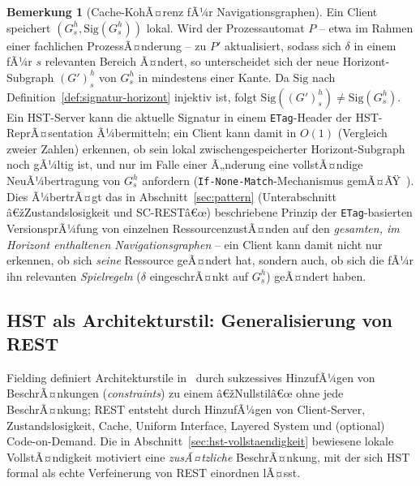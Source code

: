 ﻿\documentclass[a4paper,12pt]{article}
\theoremstyle{definition}
\newtheorem{bemerkung}{Bemerkung}
\begin{document}
\begin{bemerkung}[Cache-KohÃ¤renz fÃ¼r Navigationsgraphen]
	\label{bem:cache-kohaerenz}
	Ein Client speichert $(G_s^h,\mathrm{Sig}(G_s^h))$ lokal. Wird der Prozessautomat
	$P$ -- etwa im Rahmen einer fachlichen ProzessÃ¤nderung -- zu $P'$ aktualisiert,
	sodass sich $\delta$ in einem fÃ¼r $s$ relevanten Bereich Ã¤ndert, so unterscheidet
	sich der neue Horizont-Subgraph $(G')_s^h$ von $G_s^h$ in mindestens einer Kante.
	Da $\mathrm{Sig}$ nach Definition~\ref{def:signatur-horizont} injektiv ist, folgt
	$\mathrm{Sig}((G')_s^h)\ne\mathrm{Sig}(G_s^h)$. Ein HST-Server kann die aktuelle
	Signatur in einem \texttt{ETag}-Header der HST-ReprÃ¤sentation Ã¼bermitteln; ein
	Client kann damit in $O(1)$ (Vergleich zweier Zahlen) erkennen, ob sein lokal
	zwischengespeicherter Horizont-Subgraph noch gÃ¼ltig ist, und nur im Falle einer
	Ã„nderung eine vollstÃ¤ndige NeuÃ¼bertragung von $G_s^h$ anfordern
	(\texttt{If-None-Match}-Mechanismus gemÃ¤ÃŸ~\cite{rfc7231}). Dies Ã¼bertrÃ¤gt das in
	Abschnitt~\ref{sec:pattern} (Unterabschnitt â€žZustandslosigkeit und SC-RESTâ€œ)
	beschriebene Prinzip der \texttt{ETag}-basierten VersionsprÃ¼fung von einzelnen
	RessourcenzustÃ¤nden auf den \emph{gesamten, im Horizont enthaltenen
	Navigationsgraphen} -- ein Client kann damit nicht nur erkennen, ob sich
	\emph{seine} Ressource geÃ¤ndert hat, sondern auch, ob sich die fÃ¼r ihn relevanten
	\emph{Spielregeln} ($\delta$ eingeschrÃ¤nkt auf $G_s^h$) geÃ¤ndert haben.
\end{bemerkung}

\subsection{HST als Architekturstil: Generalisierung von REST}
\label{sec:hst-architekturstil}

Fielding definiert Architekturstile in~\cite{fielding2000} durch sukzessives HinzufÃ¼gen
von BeschrÃ¤nkungen (\emph{constraints}) zu einem â€žNullstilâ€œ ohne jede BeschrÃ¤nkung; REST
entsteht durch HinzufÃ¼gen von Client-Server, Zustandslosigkeit, Cache, Uniform
Interface, Layered System und (optional) Code-on-Demand. Die in
Abschnitt~\ref{sec:hst-vollstaendigkeit} bewiesene lokale VollstÃ¤ndigkeit motiviert eine
\emph{zusÃ¤tzliche} BeschrÃ¤nkung, mit der sich HST formal als echte Verfeinerung von REST
einordnen lÃ¤sst.
\end{document}
